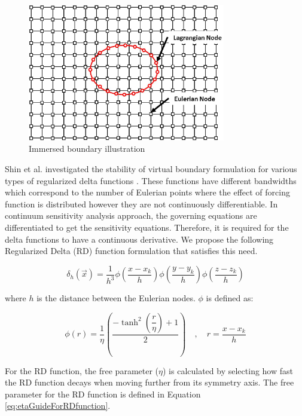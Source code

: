\documentclass[12pt]{aiaa-pretty}
\begin{document}
%
\begin{figure}[H]
	\centering
	\includegraphics[height=6.0cm]{figure/immerdBoundary.jpg}
	\caption{Immersed boundary illustration}
	\label{fig:immersedBoundary}
\end{figure}
%

Shin et al. investigated the stability of virtual boundary formulation for various types of regularized delta functions \cite{shin2008assessment}. These functions have different bandwidths which correspond to the number of Eulerian points where the effect of forcing function is distributed however they are not continuously differentiable. In continuum sensitivity analysis approach, the governing equations are differentiated to get the sensitivity equations. Therefore, it is required for the delta functions to have a continuous derivative. We propose the following Regularized Delta (RD) function formulation that satisfies this need.

%
\begin{equation}\label{eq:heavisideFunction}
	\delta_h(\vec{x}) = \frac{1}{h^3} \phi \left( \frac{x - x_k}{h} \right)
									 \phi \left( \frac{y - y_k}{h} \right)
									 \phi \left( \frac{z - z_k}{h} \right)
\end{equation}
%

where $h$ is the distance between the Eulerian nodes. $\phi$ is defined as:

%
\begin{equation}\label{eq:continuousDeltaFunction}
	\phi(r) = \dfrac{1}{\eta} \left( \dfrac{-\tanh^{2}{\left (\dfrac{r}{\eta} \right )} + 1}{2} \right)
	               \quad , \quad 
	               r = \frac{x - x_k}{h}
\end{equation}
%

For the RD function, the free parameter ($\eta$) is calculated by selecting how fast the RD function decays when moving further from its symmetry axis. The free parameter for the RD function is defined in Equation \eqref{eq:etaGuideForRDfunction}.
\end{document}
